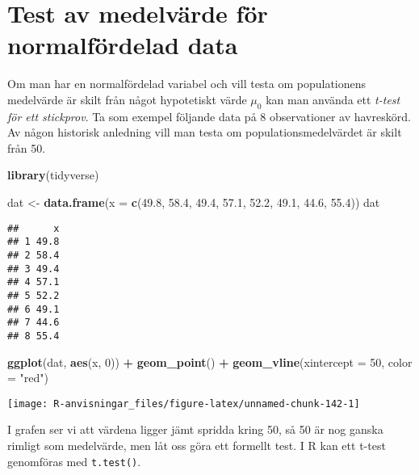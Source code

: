 \documentclass[
]{book}
\newenvironment{Shaded}{\begin{snugshade}}{\end{snugshade}}
\newcommand{\AttributeTok}[1]{\textcolor[rgb]{0.13,0.29,0.53}{#1}}
\newcommand{\DecValTok}[1]{\textcolor[rgb]{0.00,0.00,0.81}{#1}}
\newcommand{\FloatTok}[1]{\textcolor[rgb]{0.00,0.00,0.81}{#1}}
\newcommand{\FunctionTok}[1]{\textcolor[rgb]{0.13,0.29,0.53}{\textbf{#1}}}
\newcommand{\NormalTok}[1]{#1}
\newcommand{\OtherTok}[1]{\textcolor[rgb]{0.56,0.35,0.01}{#1}}
\newcommand{\SpecialCharTok}[1]{\textcolor[rgb]{0.81,0.36,0.00}{\textbf{#1}}}
\newcommand{\StringTok}[1]{\textcolor[rgb]{0.31,0.60,0.02}{#1}}
\theoremstyle{definition}
\theoremstyle{definition}
\theoremstyle{definition}
\theoremstyle{definition}
\theoremstyle{remark}
\begin{document}
\hypertarget{test-av-medelvuxe4rde-fuxf6r-normalfuxf6rdelad-data}{%
\section{Test av medelvärde för normalfördelad data}\label{test-av-medelvuxe4rde-fuxf6r-normalfuxf6rdelad-data}}

Om man har en normalfördelad variabel och vill testa om populationens medelvärde är skilt från något hypotetiskt värde \(\mu_0\) kan man använda ett \emph{t-test för ett stickprov}. Ta som exempel följande data på 8 observationer av havreskörd. Av någon historisk anledning vill man testa om populationsmedelvärdet är skilt från 50.

\begin{Shaded}
\begin{Highlighting}[]
\FunctionTok{library}\NormalTok{(tidyverse)}

\NormalTok{dat }\OtherTok{\textless{}{-}} \FunctionTok{data.frame}\NormalTok{(}\AttributeTok{x =} \FunctionTok{c}\NormalTok{(}\FloatTok{49.8}\NormalTok{, }\FloatTok{58.4}\NormalTok{, }\FloatTok{49.4}\NormalTok{, }\FloatTok{57.1}\NormalTok{, }\FloatTok{52.2}\NormalTok{, }\FloatTok{49.1}\NormalTok{, }\FloatTok{44.6}\NormalTok{, }\FloatTok{55.4}\NormalTok{))}
\NormalTok{dat}
\end{Highlighting}
\end{Shaded}

\begin{verbatim}
##      x
## 1 49.8
## 2 58.4
## 3 49.4
## 4 57.1
## 5 52.2
## 6 49.1
## 7 44.6
## 8 55.4
\end{verbatim}

\begin{Shaded}
\begin{Highlighting}[]
\FunctionTok{ggplot}\NormalTok{(dat, }\FunctionTok{aes}\NormalTok{(x, }\DecValTok{0}\NormalTok{)) }\SpecialCharTok{+} 
  \FunctionTok{geom\_point}\NormalTok{() }\SpecialCharTok{+}
  \FunctionTok{geom\_vline}\NormalTok{(}\AttributeTok{xintercept =} \DecValTok{50}\NormalTok{, }\AttributeTok{color =} \StringTok{"red"}\NormalTok{)}
\end{Highlighting}
\end{Shaded}

\begin{center}\texttt{[image: R-anvisningar\_files/figure-latex/unnamed-chunk-142-1]} \end{center}

I grafen ser vi att värdena ligger jämt spridda kring 50, så 50 är nog ganska rimligt som medelvärde, men låt oss göra ett formellt test.
I R kan ett t-test genomföras med \texttt{t.test()}.
\end{document}
